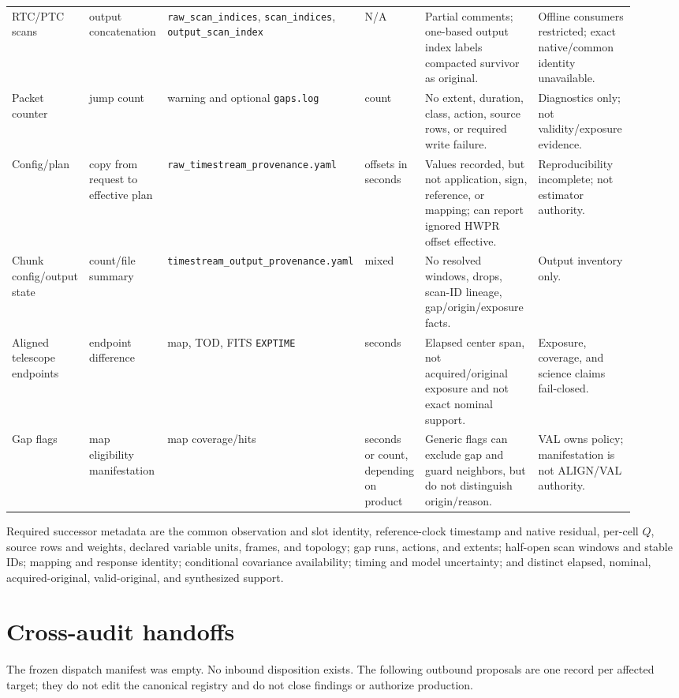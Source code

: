 \documentclass[11pt]{article}
\newcommand{\code}[1]{\nolinkurl{#1}}
\begin{document}
\begin{longtable}{L{0.12\linewidth}L{0.13\linewidth}L{0.15\linewidth}L{0.08\linewidth}L{0.24\linewidth}L{0.20\linewidth}}
RTC/PTC scans & output concatenation & \code{raw_scan_indices}, \code{scan_indices}, \code{output_scan_index} & N/A & Partial comments; one-based output index labels compacted survivor as original. & Offline consumers restricted; exact native/common identity unavailable.\\
Packet counter & jump count & warning and optional \code{gaps.log} & count & No extent, duration, class, action, source rows, or required write failure. & Diagnostics only; not validity/exposure evidence.\\
Config/plan & copy from request to effective plan & \code{raw_timestream_provenance.yaml} & offsets in seconds & Values recorded, but not application, sign, reference, or mapping; can report ignored HWPR offset effective. & Reproducibility incomplete; not estimator authority.\\
Chunk config/output state & count/file summary & \code{timestream_output_provenance.yaml} & mixed & No resolved windows, drops, scan-ID lineage, gap/origin/exposure facts. & Output inventory only.\\
Aligned telescope endpoints & endpoint difference & map, TOD, FITS \code{EXPTIME} & seconds & Elapsed center span, not acquired/original exposure and not exact nominal support. & Exposure, coverage, and science claims fail-closed.\\
Gap flags & map eligibility manifestation & map coverage/hits & seconds or count, depending on product & Generic flags can exclude gap and guard neighbors, but do not distinguish origin/reason. & VAL owns policy; manifestation is not ALIGN/VAL authority.\\
\bottomrule
\end{longtable}

Required successor metadata are the common observation and slot identity,
reference-clock timestamp and native residual, per-cell $Q$, source rows and
weights, declared variable units, frames, and topology; gap runs, actions, and extents;
half-open scan windows and stable IDs; mapping and response identity; conditional
covariance availability; timing and model uncertainty; and distinct elapsed,
nominal, acquired-original, valid-original, and synthesized support.

\section{Cross-audit handoffs}

The frozen dispatch manifest was empty.  No inbound disposition exists.  The
following outbound proposals are one record per affected target; they do not
edit the canonical registry and do not close findings or authorize production.
\end{document}

